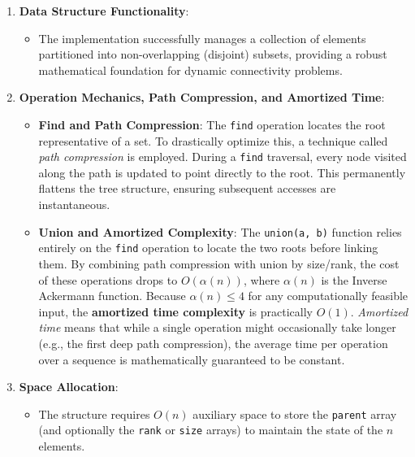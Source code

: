 \documentclass[a4paper,12pt]{article}
\begin{document}
\begin{enumerate}
    \item \textbf{Data Structure Functionality}:
    \begin{itemize}
        \item The implementation successfully manages a collection of elements partitioned into non-overlapping (disjoint) subsets, providing a robust mathematical foundation for dynamic connectivity problems.
    \end{itemize}

    \item \textbf{Operation Mechanics, Path Compression, and Amortized Time}:
    \begin{itemize}
        \item \textbf{Find and Path Compression}: The \texttt{find} operation locates the root representative of a set. To drastically optimize this, a technique called \textit{path compression} is employed. During a \texttt{find} traversal, every node visited along the path is updated to point directly to the root. This permanently flattens the tree structure, ensuring subsequent accesses are instantaneous.
        \item \textbf{Union and Amortized Complexity}: The \texttt{union(a, b)} function relies entirely on the \texttt{find} operation to locate the two roots before linking them. By combining path compression with union by size/rank, the cost of these operations drops to $O(\alpha(n))$, where $\alpha(n)$ is the Inverse Ackermann function. Because $\alpha(n) \le 4$ for any computationally feasible input, the \textbf{amortized time complexity} is practically $O(1)$. \textit{Amortized time} means that while a single operation might occasionally take longer (e.g., the first deep path compression), the average time per operation over a sequence is mathematically guaranteed to be constant.
    \end{itemize}

    \item \textbf{Space Allocation}: 
    \begin{itemize}
        \item The structure requires $O(n)$ auxiliary space to store the \texttt{parent} array (and optionally the \texttt{rank} or \texttt{size} arrays) to maintain the state of the $n$ elements.
    \end{itemize}
\end{enumerate}

\newpage
\end{document}
